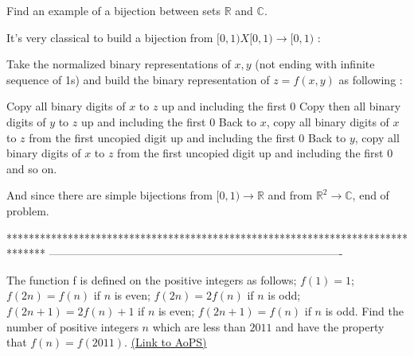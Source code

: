 \begin{solution}
	\begin{tcolorbox}Find an example of a bijection between sets $\mathbb{R}$ and $\mathbb{C}$.\end{tcolorbox}
It's very classical to build a bijection from $[0,1)X[0,1)\to[0,1)$ :

Take the normalized binary representations of $x,y$ (not ending with infinite sequence of 1s) and build the binary representation of $z=f(x,y)$ as following :

Copy all binary digits of $x$ to $z$ up and including the first $0$
Copy then all binary digits of $y$ to $z$ up and including the first $0$
Back to $x$, copy all binary digits of $x$ to $z$ from the first uncopied digit up and including the first $0$
Back to $y$, copy all binary digits of $x$ to $z$ from the first uncopied digit up and including the first $0$
and so on.

And since there are simple bijections from $[0,1)\to\mathbb R$ and from $\mathbb R^2\to\mathbb C$, end of problem.
\end{solution}
*******************************************************************************
-------------------------------------------------------------------------------

\begin{problem}
	The function f is defined on the positive integers as follows;
$f(1) = 1$;
$f(2n) = f(n)$ if $n$ is even;
$f(2n) = 2f(n)$ if $n$ is odd;
$f(2n + 1) = 2f(n) + 1$ if $n$ is even;
$f(2n + 1) = f(n)$ if $n $ is odd.
Find the number of positive integers $n$ which are less than $2011$ and
have the property that $f(n) = f(2011)$.
	\flushright \href{https://artofproblemsolving.com/community/c6h596638}{(Link to AoPS)}
\end{problem}



